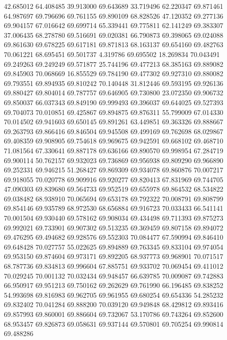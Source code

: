 42.685012
64.408485
39.913000
69.643689
33.719496
62.220347
69.871461
64.987697
69.796696
69.761155
69.890109
68.828526
47.120352
69.277136
69.904157
67.016642
69.699714
65.339441
69.775811
62.141249
69.383307
37.006435
68.278780
69.516691
69.020381
66.790873
69.398065
69.024088
69.861630
69.678225
69.617181
69.871813
68.163137
69.654160
69.482763
70.061221
68.695451
69.501737
4.319786
69.695502
18.269834
70.043491
69.249263
69.249249
69.571877
25.744196
69.477213
68.385163
69.889082
69.845903
70.068669
16.855529
69.784190
69.477302
69.927310
69.880082
69.793551
69.894935
69.810242
70.140448
31.812446
69.593195
69.926136
69.880427
69.804014
69.787757
69.646905
69.730800
23.072350
69.906732
69.850037
66.037343
69.849190
69.999493
69.396037
69.644025
69.527393
69.704073
70.010851
69.425867
69.894875
69.876311
55.799009
67.014330
70.014502
69.941603
69.650145
69.891261
63.449851
69.363326
69.888667
69.263793
69.866416
69.846504
69.945508
69.499169
69.762698
68.029867
69.408359
69.908905
69.754618
69.969675
69.942591
69.668102
69.468710
71.081564
67.330641
69.887178
69.636166
69.890570
69.998954
67.284719
69.900114
50.762157
69.932023
69.736869
69.956938
69.809290
69.966890
69.252331
69.946215
51.268427
69.869309
69.934078
69.860876
70.007217
69.918055
70.020778
69.909916
69.920277
69.820413
67.831969
69.744705
47.090303
69.839680
69.564733
69.952519
69.655978
69.864532
68.534822
69.038482
68.938910
70.065694
69.653178
69.792322
70.008791
69.808799
69.854146
69.935789
68.972530
68.656884
69.916723
70.033433
66.541141
70.001504
69.930440
69.578162
69.908034
69.434498
69.711393
69.875273
69.992021
69.733901
69.907302
69.513235
69.369459
69.807158
69.894072
69.476295
69.494682
69.928576
69.552303
70.084477
67.590994
69.846410
69.648428
70.027757
55.022625
69.894889
69.763345
69.833104
69.974054
69.953150
69.874604
69.973171
69.892205
68.937773
69.968901
70.071517
68.787736
69.834813
69.996604
67.885751
69.933702
70.069454
69.411012
70.029245
70.001132
70.032434
69.948457
66.639785
70.009087
69.742883
66.950917
69.951213
69.750162
69.262629
69.761990
66.196485
69.838252
54.993698
69.816983
69.962705
69.961955
69.680254
69.654336
54.285232
69.832402
70.041284
69.888200
70.039120
69.949848
68.429812
69.893416
69.857993
69.860001
69.886604
69.732067
53.170786
69.743264
69.852600
68.953457
69.826873
69.058631
69.937144
69.570801
69.705254
69.990814
69.488286
